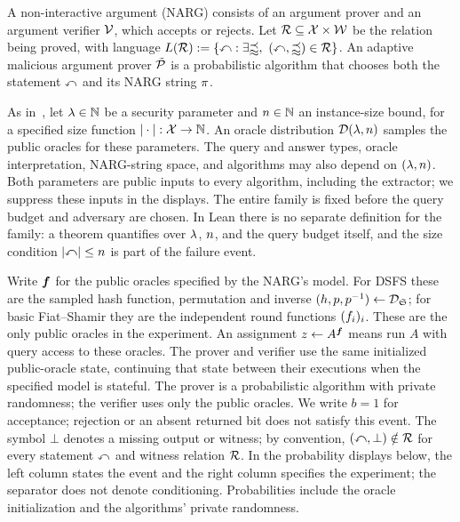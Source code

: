 A non-interactive argument (NARG) consists of an argument prover and an argument verifier \(\mathcal{V}\), which accepts or rejects. Let \(\mathcal{R}\subseteq\mathcal X\times\mathcal W\) be the relation being proved, with language \(\RelationLanguage{\Relation}:=\{\Instance:\exists\WitnessValue,\ (\Instance,\WitnessValue)\in\Relation\}\). An adaptive malicious argument prover \(\tilde{\mathcal{P}}\) is a probabilistic algorithm that chooses both the statement \(\mathbb{x}\) and its NARG string \(\pi\).

As in~\cite[Section~9.1]{snarg-book}, let \(\lambda\in\mathbb N\) be a security parameter and \(n\in\mathbb N\) an instance-size bound, for a specified size function \(|\cdot|:\mathcal X\to\mathbb N\). An oracle distribution \(\mathcal{D}(\lambda,n)\) samples the public oracles for these parameters. The query and answer types, oracle interpretation, NARG-string space, and algorithms may also depend on \((\lambda,n)\). Both parameters are public inputs to every algorithm, including the extractor; we suppress these inputs in the displays. The entire family is fixed before the query budget and adversary are chosen. In Lean there is no separate definition for the family: a theorem quantifies over \(\lambda\), \(n\), and the query budget itself, and the size condition \(|\mathbb{x}|\le n\) is part of the failure event.

Write \(\boldsymbol{f}\) for the public oracles specified by the NARG's model. For DSFS these are the sampled hash function, permutation and inverse \((h,p,p^{-1})\leftarrow\mathcal{D}_{\mathfrak S}\); for basic Fiat--Shamir they are the independent round functions \((f_i)_i\). These are the only public oracles in the experiment. An assignment \(z\leftarrow A^{\boldsymbol{f}}\) means run \(A\) with query access to these oracles. The prover and verifier use the same initialized public-oracle state, continuing that state between their executions when the specified model is stateful. The prover is a probabilistic algorithm with private randomness; the verifier uses only the public oracles. We write \(b=1\) for acceptance; rejection or an absent returned bit does not satisfy this event. The symbol \(\bot\) denotes a missing output or witness; by convention, \((\mathbb{x},\bot)\notin\mathcal{R}\) for every statement \(\mathbb{x}\) and witness relation \(\mathcal{R}\). In the probability displays below, the left column states the event and the right column specifies the experiment; the separator does not denote conditioning. Probabilities include the oracle initialization and the algorithms' private randomness.

